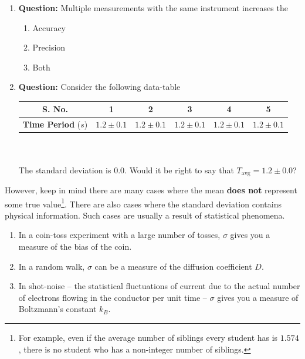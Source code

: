 \begin{question}
\begin{enumerate}
    \item \textbf{Question:} Multiple measurements with the same instrument increases the
    \begin{enumerate}
        \item Accuracy
        \item Precision
        \item Both
    \end{enumerate}
    
    \item \textbf{Question:} Consider the following data-table~\\
    \begin{tabular}{cccccc}
    \hline
    \textbf{S. No.}&1&2&3&4&5\\
    \hline
    \textbf{Time Period} ($s$)& $1.2\pm0.1$&$1.2\pm0.1$&$1.2\pm0.1$&$1.2\pm0.1$&$1.2\pm0.1$\\
    \hline
    \end{tabular}~\\~\\
    The standard deviation is $0.0$. Would it be right to say that $T_\text{avg} = 1.2\pm 0.0$?
\end{enumerate}
\end{question}

However, keep in mind there are many cases where the mean  \textbf{does not} represent some true value\footnote{For example, even if the average number of siblings every student has is $1.574$, there is no student who has a non-integer number of siblings.}. There are also cases where the standard deviation contains physical information. Such cases are usually a result of statistical phenomena.

\begin{tip}
\begin{enumerate}
    \item In a coin-toss experiment with a large number of tosses, $\sigma$ gives you a measure of the bias of the coin.
    \item In a random walk, $\sigma$ can be a measure of the diffusion coefficient $D$.
    \item In shot-noise --  the statistical fluctuations of current due to the actual number of electrons flowing in the conductor per unit time -- $\sigma$ gives you a measure of Boltzmann's constant $k_B$.
\end{enumerate}
\end{tip}


